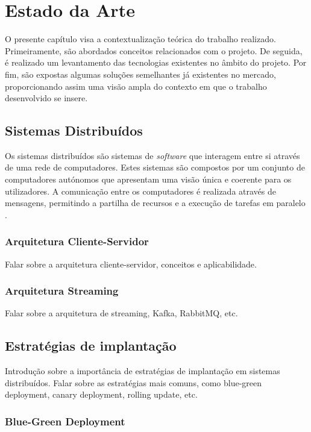 \chapter{Estado da Arte}
\label{sec:2-EstadoArte}

O presente capítulo visa a contextualização teórica do trabalho realizado. Primeiramente, são 
abordados conceitos relacionados com o projeto. De seguida, é realizado um levantamento das 
tecnologias existentes no âmbito do projeto. Por fim, são expostas algumas soluções semelhantes 
já existentes no mercado, proporcionando assim uma visão ampla do contexto em que o trabalho 
desenvolvido se insere.

\section{Sistemas Distribuídos}

Os sistemas distribuídos são sistemas de \textit{software} que interagem entre si através de uma rede
de computadores. Estes sistemas são compostos por um conjunto de computadores autónomos que
apresentam uma visão única e coerente para os utilizadores. A comunicação entre os computadores
é realizada através de mensagens, permitindo a partilha de recursos e a execução de tarefas em
paralelo \cite{verissimo2001distributed}.

\subsection{Arquitetura Cliente-Servidor}

Falar sobre a arquitetura cliente-servidor, conceitos e aplicabilidade.

\subsection{Arquitetura Streaming}

Falar sobre a arquitetura de streaming, Kafka, RabbitMQ, etc.

\section{Estratégias de implantação}

Introdução sobre a importância de estratégias de implantação em sistemas distribuídos. Falar sobre
as estratégias mais comuns, como blue-green deployment, canary deployment, rolling update, etc.

\subsection{Blue-Green Deployment}

